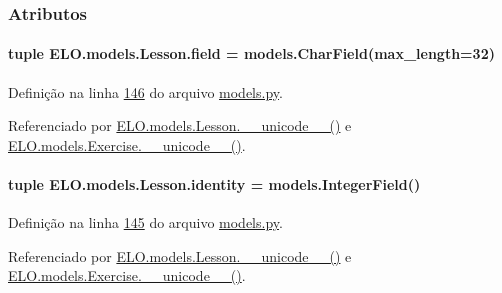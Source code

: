 \subsubsection{Atributos}
\hypertarget{classELO_1_1models_1_1Lesson_a1657c9c36e8d9c58d86c272e2339e7b1}{
\paragraph[{field}]{\setlength{\rightskip}{0pt plus 5cm}tuple E\-L\-O.\-models.\-Lesson.\-field = models.\-Char\-Field(max\-\_\-length=32)\hspace{0.3cm}{\ttfamily [static]}}}\label{classELO_1_1models_1_1Lesson_a1657c9c36e8d9c58d86c272e2339e7b1}


Definição na linha \hyperlink{ELO_2models_8py_source_l00146}{146} do arquivo \hyperlink{ELO_2models_8py_source}{models.\-py}.



Referenciado por \hyperlink{classELO_1_1models_1_1Lesson_a3d9f0295dbe1ed5c74668d6c0876f97c}{E\-L\-O.\-models.\-Lesson.\-\_\-\-\_\-unicode\-\_\-\-\_\-()} e \hyperlink{classELO_1_1models_1_1Exercise_af3e991e5610cec815a2c3260ec6aae0b}{E\-L\-O.\-models.\-Exercise.\-\_\-\-\_\-unicode\-\_\-\-\_\-()}.

\hypertarget{classELO_1_1models_1_1Lesson_aa650c6add387eee9e15421717074c0d3}{
\paragraph[{identity}]{\setlength{\rightskip}{0pt plus 5cm}tuple E\-L\-O.\-models.\-Lesson.\-identity = models.\-Integer\-Field()\hspace{0.3cm}{\ttfamily [static]}}}\label{classELO_1_1models_1_1Lesson_aa650c6add387eee9e15421717074c0d3}


Definição na linha \hyperlink{ELO_2models_8py_source_l00145}{145} do arquivo \hyperlink{ELO_2models_8py_source}{models.\-py}.



Referenciado por \hyperlink{classELO_1_1models_1_1Lesson_a3d9f0295dbe1ed5c74668d6c0876f97c}{E\-L\-O.\-models.\-Lesson.\-\_\-\-\_\-unicode\-\_\-\-\_\-()} e \hyperlink{classELO_1_1models_1_1Exercise_af3e991e5610cec815a2c3260ec6aae0b}{E\-L\-O.\-models.\-Exercise.\-\_\-\-\_\-unicode\-\_\-\-\_\-()}.

